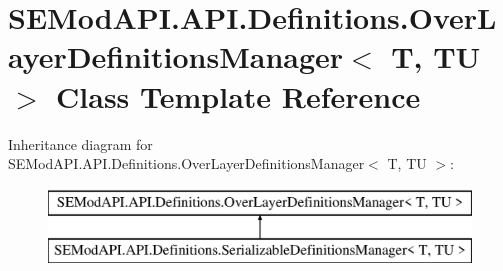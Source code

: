 \hypertarget{class_s_e_mod_a_p_i_1_1_a_p_i_1_1_definitions_1_1_over_layer_definitions_manager}{}\section{S\+E\+Mod\+A\+P\+I.\+A\+P\+I.\+Definitions.\+Over\+Layer\+Definitions\+Manager$<$ T, T\+U $>$ Class Template Reference}
\label{class_s_e_mod_a_p_i_1_1_a_p_i_1_1_definitions_1_1_over_layer_definitions_manager}
Inheritance diagram for S\+E\+Mod\+A\+P\+I.\+A\+P\+I.\+Definitions.\+Over\+Layer\+Definitions\+Manager$<$ T, T\+U $>$\+:\begin{figure}[H]
\begin{center}
\leavevmode
\includegraphics[height=2.000000cm]{class_s_e_mod_a_p_i_1_1_a_p_i_1_1_definitions_1_1_over_layer_definitions_manager}
\end{center}
\end{figure}
